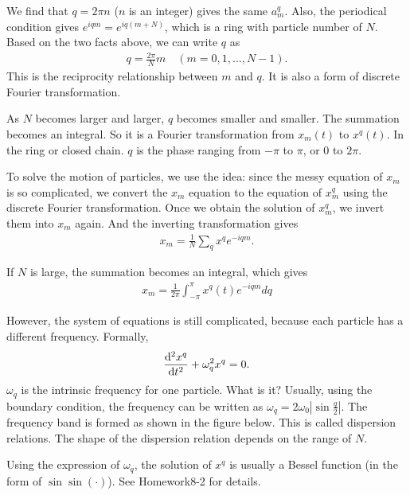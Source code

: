 We find that $ q=2\pi n $ ($ n $ is an integer) gives the same $ a^q_m $. Also, the periodical condition gives $ e^{iqm}=e^{iq(m+N)} $, which is a ring with particle number of $ N $. Based on the two facts above, we can write $ q $ as 
\begin{align}
q=\frac{2\pi}{N}m\quad (m=0,1,\ldots , N-1).
\end{align}
This is the reciprocity relationship between $ m $ and $ q $. It is also a form of discrete Fourier transformation. 


As $ N $ becomes larger and larger, $ q $ becomes smaller and smaller. The summation  becomes an integral. So it is a Fourier transformation from $ x_m(t) $ to $ x^q(t) $. In the ring or closed chain. $ q $ is the phase ranging from $ -\pi $ to $ \pi $, or $ 0 $ to $ 2\pi $. 

To solve the motion of particles, we use the idea: since the messy equation of $ x_m $ is so complicated, we convert the $ x_m $ equation to the equation of $ x^q_m $ using the discrete Fourier transformation. Once we obtain the solution of $ x^q_m $, we invert them into $ x_m $ again. And the inverting transformation gives
\begin{align}
x_m=\frac{1}{N}\sum_q x^q e^{-iqm}.
\end{align}

If $ N $ is large, the summation becomes an integral, which gives
\begin{align}
x_m=\frac{1}{2\pi}\int_{-\pi}^{\pi} x^q(t) e^{-iqm}dq
\end{align}

However, the system of equations is still complicated, because each particle has a different frequency. Formally,
\begin{align}
\frac{{\mathrm d}^2 {x^q}}{{\mathrm d}t^2}+\omega_q^2 x^q=0.
\end{align}
$ \omega_q $ is the intrinsic frequency for one particle. What is it? Usually, using the boundary condition, the frequency can be written as $ \omega_q=2\omega_0 \left| \sin \frac{q}{2} \right| $. The frequency band is formed as shown in the figure below. This is called dispersion relations. The shape of the dispersion relation depends on the range of $ N $. 


Using the expression of $ \omega_q $, the solution of $ x^q $ is usually a Bessel function (in the form of $ \sin\sin(\cdot) $). See Homework8-2 for details. 

